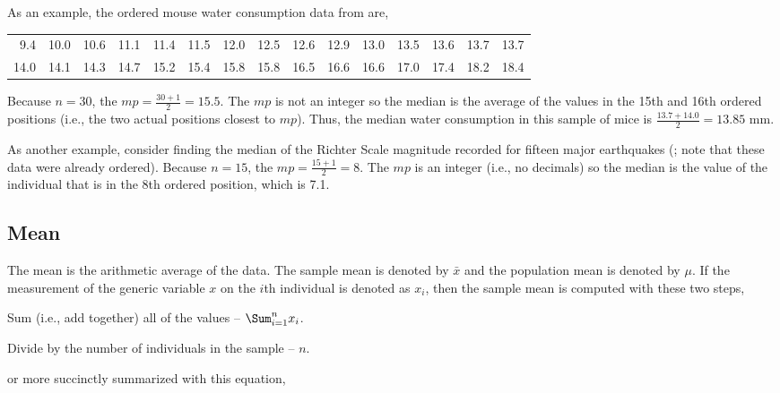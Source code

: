 \documentclass[10pt,openany]{book}\usepackage[]{graphicx}\usepackage[]{color}
\begin{document}
As an example, the ordered mouse water consumption data from  are,

\begin{tabular}{rrrrrrrrrrrrrrr}
  9.4 & 10.0 & 10.6 & 11.1 & 11.4 & 11.5 & 12.0 & 12.5 & 12.6 & 12.9 & 13.0 & 13.5 & 13.6 & 13.7 & 13.7 \\ 
  14.0 & 14.1 & 14.3 & 14.7 & 15.2 & 15.4 & 15.8 & 15.8 & 16.5 & 16.6 & 16.6 & 17.0 & 17.4 & 18.2 & 18.4 \\ 
  \end{tabular}


Because $n=30$, the $mp=\frac{30+1}{2}=15.5$.  The $mp$ is not an integer so the median is the average of the values in the 15th and 16th ordered positions (i.e., the two actual positions closest to $mp$).  Thus, the median water consumption in this sample of mice is $\frac{13.7+14.0}{2}=13.85$ mm.

As another example, consider finding the median of the Richter Scale magnitude recorded for fifteen major earthquakes (; note that these data were already ordered).  Because $n=15$, the $mp=\frac{15+1}{2}=8$.  The $mp$ is an integer (i.e., no decimals) so the median is the value of the individual that is in the 8th ordered position, which is 7.1.


\subsection{Mean}
The mean is the arithmetic average of the data.  The sample mean is denoted by $\bar{x}$ and the population mean is denoted by $\mu$.  If the measurement of the generic variable $x$ on the $i$th individual is denoted as $x_{i}$, then the sample mean is computed with these two steps,
\begin{Enumerate}
  \item Sum (i.e., add together) all of the values -- $\Sum_{i=1}^{n}x_{i}$.
  \item Divide by the number of individuals in the sample -- $n$.
\end{Enumerate}
or more succinctly summarized with this equation,
\end{document}
